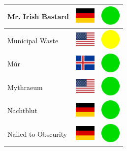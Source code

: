 \documentclass[12pt, a4paper, twoside]{report}
\begin{document}
\begin{center}
\begin{longtable}{|p{5cm}|p{2cm}|p{2cm}|}
Mr. Irish Bastard & \includegraphics[width=1cm]{4x3/de} & \includegraphics[width=1cm]{likes/y} \\ \hline
Municipal Waste & \includegraphics[width=1cm]{4x3/us} & \includegraphics[width=1cm]{likes/m} \\ \hline
Múr & \includegraphics[width=1cm]{4x3/is} & \includegraphics[width=1cm]{likes/y} \\ \hline
Mythraeum & \includegraphics[width=1cm]{4x3/us} & \includegraphics[width=1cm]{likes/y} \\ \hline
Nachtblut & \includegraphics[width=1cm]{4x3/de} & \includegraphics[width=1cm]{likes/y} \\ \hline
Nailed to Obscurity & \includegraphics[width=1cm]{4x3/de} & \includegraphics[width=1cm]{likes/y} \\ \hline

\end{longtable}
\end{center}
\end{document}
